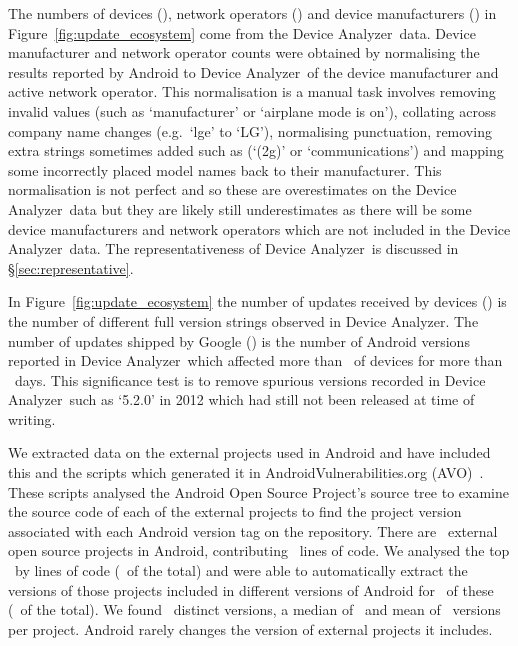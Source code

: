 \documentclass{sig-alternate}
\let\OldTodo\todo
\renewcommand{\todo}{\OldTodo[inline]}
\newcommand{\todolater}[1]{}%
\newcommand{\da}{Device Analyzer}
\newcommand{\avo}{AVO}
\begin{document}
The numbers of devices (\daNumOSDevices), network operators (\daNumOperators) and device manufacturers (\daNumManufacturers) in Figure~\ref{fig:update_ecosystem} come from the \da\ data.
Device manufacturer and network operator counts were obtained by normalising the results reported by Android to \da\ of the device manufacturer and active network operator.
This normalisation is a manual task involves removing invalid values (such as `manufacturer' or `airplane mode is on'), collating across company name changes (e.g.\ `lge' to `LG'), normalising punctuation, removing extra strings sometimes added such as (`(2g)' or `communications') and mapping some incorrectly placed model names back to their manufacturer.
This normalisation is not perfect and so these are overestimates on the \da\ data but they are likely still underestimates as there will be some device manufacturers and network operators which are not included in the \da\ data.
The representativeness of \da\ is discussed in \S\ref{sec:representative}.

In Figure~\ref{fig:update_ecosystem} the number of updates received by devices (\daNumFullVersions) is the number of different full version strings observed in \da.
The number of updates shipped by Google (\daNumSigOSVersions) is the number of Android versions reported in \da\ which affected more than \daSigVersionPerc\ of devices for more than \daSigVersionDays\ days.
This significance test is to remove spurious versions recorded in \da\ such as `5.2.0' in 2012 which had still not been released at time of writing.\todolater{Check if this has now been released}

We extracted data on the external projects used in Android and have included this and the scripts which generated it in AndroidVulnerabilities.org (\avo)~\cite{androidvulnerabilities.org}.
These scripts analysed the Android Open Source Project's source tree to examine the source code of each of the external projects to find the project version associated with each Android version tag on the repository.
There are \avoNumExternalProjects\ external open source projects in Android, contributing \avoTotalExternalLines\ lines of code.
We analysed the top \avoNumBigExternalProjects\ by lines of code (\avoBigExternalLinesOfCodePerc\ of the total) and were able to automatically extract the versions of those projects included in different versions of Android for \avoNumAnalysedExternalProjects\ of these (\avoAnalysedExternalLinesOfCodePerc\ of the total).
We found \avoBigExternalTotalVersions\ distinct versions, a median of \avoBigExternalMedianVersions\ and mean of \avoBigExternalMeanVersions\ versions per project.
Android rarely changes the version of external projects it includes.
\end{document}
